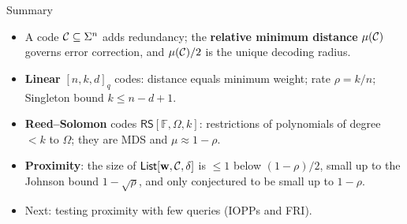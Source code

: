 \documentclass{zkdl-presentation-template}
\begin{document}
    \begin{frame}{Summary}
        \begin{itemize}
            \item A code $\mathcal{C} \subseteq \Sigma^n$ adds redundancy; the \textbf{relative minimum distance} $\mu(\mathcal{C})$ governs error correction, and $\mu(\mathcal{C})/2$ is the unique decoding radius.\pause
            \item \textbf{Linear} $[n,k,d]_q$ codes: distance equals minimum weight; rate $\rho = k/n$; Singleton bound $k \leq n - d + 1$.\pause
            \item \textbf{Reed--Solomon} codes $\mathsf{RS}[\mathbb{F},\Omega,k]$: restrictions of polynomials of degree $< k$ to $\Omega$; they are MDS and $\mu \approx 1 - \rho$.\pause
            \item \textbf{Proximity}: the size of $\mathsf{List}[\mathbf{w},\mathcal{C},\delta]$ is $\leq 1$ below $(1-\rho)/2$, small up to the Johnson bound $1 - \sqrt{\rho}$, and only conjectured to be small up to $1-\rho$.\pause
            \item Next: testing proximity with few queries (IOPPs and FRI).
        \end{itemize}
    \end{frame}

    \makeclosingframe
\end{document}
